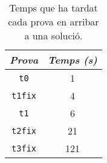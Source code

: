 \documentclass{article}
\begin{document}
\begin{table}[ht]
	\centering
	\begin{tabular}{|c|c|}
		\hline
		\emph{Prova} & \emph{Temps (s)} \\
		\hline
		\texttt{t0} & 1 \\
		\texttt{t1fix} & 4 \\
		\texttt{t1} & 6 \\
		\texttt{t2fix} & 21 \\
		\texttt{t3fix} & 121 \\
		\hline
	\end{tabular}
	\caption{Temps que ha tardat cada prova en arribar a una solució.}
	\label{tab:performance}
\end{table}
\end{document}
